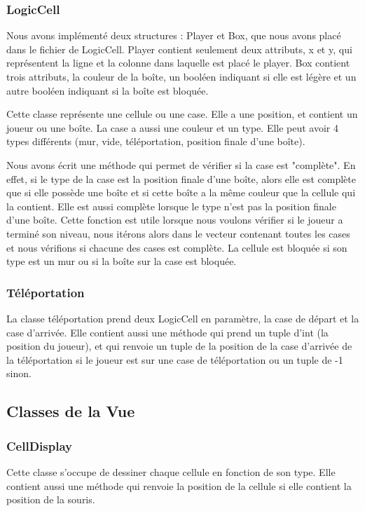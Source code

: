 \documentclass[utf8]{article}
\begin{document}
\begin{large}
\subsubsection{LogicCell}
\indent
\par
Nous avons implémenté deux structures : Player et Box, que nous avons placé dans
le fichier de LogicCell. Player contient seulement deux attributs, x et y, qui
représentent la ligne et la colonne dans laquelle est placé le player. Box
contient trois attributs, la couleur de la boîte, un booléen indiquant si elle
est légère et un autre booléen indiquant si la boîte est bloquée.
\par
Cette classe représente une cellule ou une case. Elle a une position, et
contient un joueur ou une boîte. La case a aussi une couleur et un type. Elle
peut avoir 4 types différents (mur, vide, téléportation, position finale d'une
boîte). 
\par
Nous avons écrit une méthode qui permet de vérifier si la case est
"complète". En effet, si le type de la case est la position finale d'une boîte,
alors elle est complète que si elle possède une boîte et si cette boîte a la
même couleur que la cellule qui la contient. Elle est aussi complète lorsque le
type n'est pas la position finale d'une boîte. Cette fonction est utile
lorsque nous voulons vérifier si le joueur a terminé son niveau, nous itérons alors
dans le vecteur contenant toutes les cases et nous vérifions si chacune des
cases est complète. La cellule est bloquée si son type est un mur ou si la boîte
sur la case est bloquée.
\par
\subsubsection{Téléportation}
\indent
\par
La classe téléportation prend deux LogicCell en paramètre, la case de départ et
la case d'arrivée. Elle contient aussi une méthode qui prend un tuple d'int (la
position du joueur), et qui renvoie un tuple de la position de la case d'arrivée
de la téléportation si le joueur est sur une case de téléportation ou un tuple
de -1 sinon.
\par
\subsection{Classes de la Vue}
\subsubsection{CellDisplay}
\indent
\par
Cette classe s'occupe de dessiner chaque cellule en fonction de son type. Elle
contient aussi une méthode qui renvoie la position de la cellule si elle
contient la position de la souris.
\par

\end{large}
\end{document}
